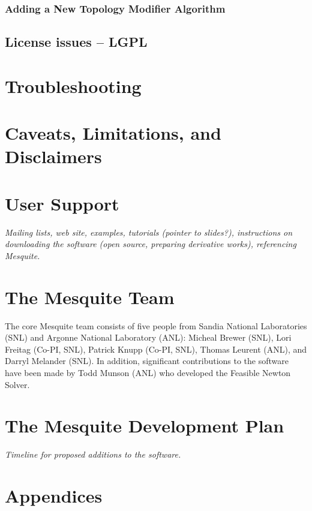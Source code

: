\documentclass[letter]{report}
\begin{document}
\subsection{Adding a New Topology Modifier Algorithm}

\section{License issues -- LGPL}


\chapter{Troubleshooting}

\chapter{Caveats, Limitations, and Disclaimers}

\chapter{User Support}

{\it Mailing lists, web site, examples, tutorials (pointer to slides?), 
instructions on downloading the software (open source, preparing 
derivative works), referencing Mesquite.}

\chapter{The Mesquite Team}

The core Mesquite team consists of five people from Sandia
National Laboratories (SNL) and Argonne National Laboratory (ANL):
Micheal Brewer (SNL), Lori Freitag (Co-PI, SNL), Patrick Knupp (Co-PI, SNL), 
Thomas Leurent (ANL), and Darryl Melander (SNL).  In addition,
significant contributions to the software have been made by
Todd Munson (ANL) who developed the Feasible Newton Solver.

\chapter{The Mesquite Development Plan}

{\it Timeline for proposed additions to the software.}



\chapter{Appendices}
\end{document}
